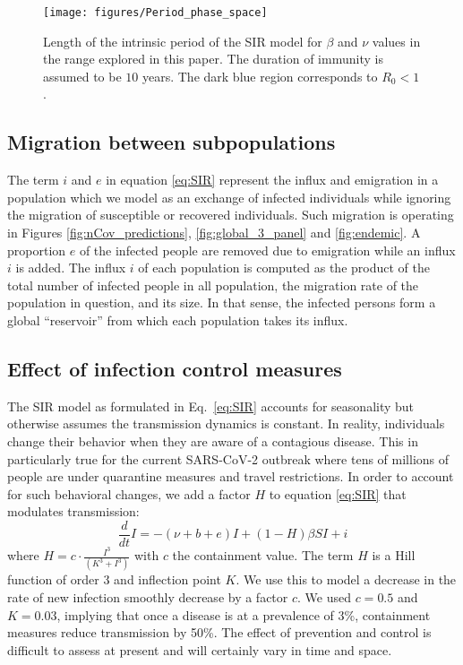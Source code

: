 \documentclass[rmp, reprint, superscriptaddress, floatfix,amsmath]{revtex4-1}
\begin{document}
\begin{figure}[htb]
	\centering
	\texttt{[image: figures/Period\_phase\_space]}
	\caption{Length of the intrinsic period of the SIR model for $\beta$ and $\nu$ values in the range explored in this paper. The duration of immunity is assumed to be $10$ years. The dark blue region corresponds to $R_0<1$. }
	\label{fig:intrinsicPeriod}
\end{figure}


\subsection*{Migration between subpopulations}

The term $i$ and $e$ in equation \ref{eq:SIR} represent the influx and emigration in a population which we model as an exchange of infected individuals while ignoring the migration of susceptible or recovered individuals.
Such migration is operating in Figures \ref{fig:nCov_predictions}, \ref{fig:global_3_panel} and \ref{fig:endemic}. 
A proportion $e$ of the infected people are removed due to emigration while an influx $i$ is added.
The influx $i$ of each population is computed as the product of the total number of infected people in all population, the migration rate of the population in question, and its size. 
In that sense, the infected persons form a global ``reservoir'' from which each population takes its influx.

\subsection*{Effect of infection control measures}
The SIR model as formulated in Eq.~\ref{eq:SIR} accounts for seasonality but otherwise assumes the transmission dynamics is constant. 
In reality, individuals change their behavior when they are aware of a contagious disease.
This in particularly true for the current SARS-CoV-2 outbreak where tens of millions of people are under quarantine measures and travel restrictions.
In order to account for such behavioral changes, we add a factor $H$ to equation \ref{eq:SIR} that modulates transmission:
\begin{equation}
\frac{d}{dt} I =  -(\nu+b+e) I + (1-H)\beta S I + i
\end{equation}
where $H = c\cdot\frac{I^3}{(K^3+I^3)}$ with $c$ the containment value. The term $H$ is a Hill function of order 3 and inflection point $K$. 
We use this to model a decrease in the rate of new infection smoothly decrease by a factor $c$. 
We used $c=0.5$ and $K=0.03$, implying that once a disease is at a prevalence of 3\%, containment measures reduce transmission by 50\%.
The effect of prevention and control is difficult to assess at present and will certainly vary in time and space. 
\end{document}
